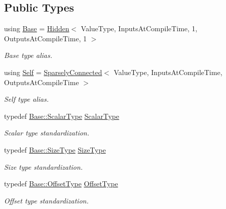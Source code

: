 \subsection*{Public Types}
\begin{DoxyCompactItemize}
\item 
using \hyperlink{classffnn_1_1layer_1_1_sparsely_connected_af35eb87098c81ea0eb0cd9b3b702a614}{Base} = \hyperlink{classffnn_1_1layer_1_1_hidden}{Hidden}$<$ Value\-Type, Inputs\-At\-Compile\-Time, 1, Outputs\-At\-Compile\-Time, 1 $>$
\begin{DoxyCompactList}\small\item\em Base type alias. \end{DoxyCompactList}\item 
using \hyperlink{classffnn_1_1layer_1_1_sparsely_connected_ad27c96a5f26e2f44fb25bebd9a838666}{Self} = \hyperlink{classffnn_1_1layer_1_1_sparsely_connected}{Sparsely\-Connected}$<$ Value\-Type, Inputs\-At\-Compile\-Time, Outputs\-At\-Compile\-Time $>$
\begin{DoxyCompactList}\small\item\em Self type alias. \end{DoxyCompactList}\item 
typedef \hyperlink{classffnn_1_1layer_1_1internal_1_1_interface_a7f834e3365e5199bcbcd16d9abd63941}{Base\-::\-Scalar\-Type} \hyperlink{classffnn_1_1layer_1_1_sparsely_connected_abe2b75254f39c0bec9f02b2e906e7919}{Scalar\-Type}
\begin{DoxyCompactList}\small\item\em Scalar type standardization. \end{DoxyCompactList}\item 
typedef \hyperlink{classffnn_1_1layer_1_1_hidden_a3deb1dc4b3a83b3d6749474debee025f}{Base\-::\-Size\-Type} \hyperlink{classffnn_1_1layer_1_1_sparsely_connected_a86b75c2723c1f8b6771224257f5eb1c1}{Size\-Type}
\begin{DoxyCompactList}\small\item\em Size type standardization. \end{DoxyCompactList}\item 
typedef \hyperlink{classffnn_1_1layer_1_1_hidden_a4a191bc002b2545231a3d80c99004693}{Base\-::\-Offset\-Type} \hyperlink{classffnn_1_1layer_1_1_sparsely_connected_aca8272f02c6417eea3c77dc0cb2bb49e}{Offset\-Type}
\begin{DoxyCompactList}\small\item\em Offset type standardization. \end{DoxyCompactList}\item 

\end{DoxyCompactItemize}
